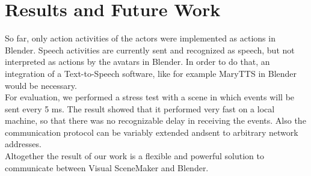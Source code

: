 \documentclass[
10pt, %
a4paper, %
oneside,
headinclude,footinclude, %
BCOR 0mm, %
]{scrartcl}
\begin{document}

\section{Results and Future Work}
So far, only action activities of the actors were implemented as actions in Blender. Speech activities are currently sent and recognized as speech, but not interpreted as actions by the avatars in Blender. In order to do that, an integration of a Text-to-Speech software, like for example MaryTTS in Blender would be necessary. \\
For evaluation, we performed a stress test with a scene in which events will be sent every 5 ms. The result showed that it performed very fast on a local machine, so that there was no recognizable delay in receiving the events. Also the communication protocol can be variably extended andsent to arbitrary network addresses.\\
Altogether the result of our work is a flexible and powerful solution to communicate between Visual SceneMaker and Blender.
\end{document}
